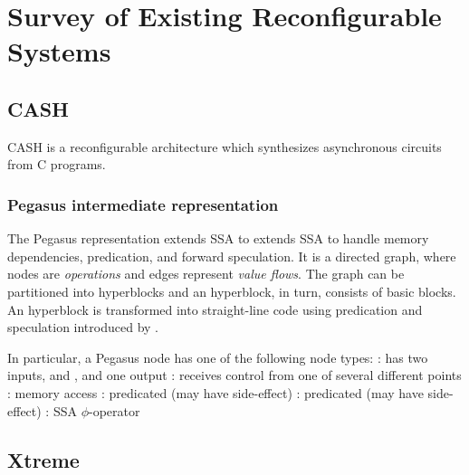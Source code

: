 \chapter{Survey of Existing Reconfigurable Systems}
\section{CASH}
CASH is a reconfigurable architecture which synthesizes asynchronous circuits
from C programs.

\subsection{Pegasus intermediate representation}
The Pegasus representation extends SSA to 
extends SSA to handle memory dependencies, predication, and forward
  speculation.
It is a directed graph, where nodes are {\em operations\/} and edges
represent {\em value flows\/}.
The graph can be partitioned into hyperblocks and
an hyperblock, in turn, consists of basic blocks.
An hyperblock is transformed into straight-line code using predication
and speculation introduced by . 

In particular, a Pegasus node has one of the following node types:
     \bit
     \w {}: has two inputs,  and
     , and one output
     \w {}: receives control from one of several different
     points 
     \w {}: memory access
     \w {}: predicated (may have side-effect)
     \w {}: predicated (may have side-effect)
     \w {}: SSA $\phi$-operator
     \eit


\section{Xtreme}
